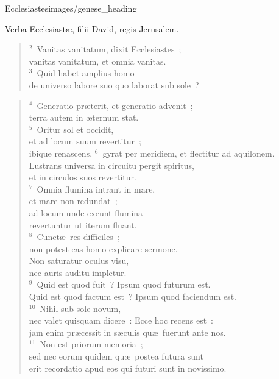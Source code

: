{Ecclesiastes}{images/genese_heading}


\lettrine[lines=6,image=true,loversize=0.05,lraise=-0.03]{V}{}erba Ecclesiast\ae , filii David, regis Jerusalem.
\begin{flushleft}\begin{verse}\vspace{6pt}${}^{2}$~Vanitas vanitatum, dixit Ecclesiastes~;\\ vanitas vanitatum, et omnia vanitas.\\
${}^{3}$~Quid habet amplius homo\\ de universo labore suo quo laborat sub sole~?\end{verse}\end{flushleft}


\begin{flushleft}\begin{verse}${}^{4}$~Generatio pr\ae terit, et generatio advenit~;\\ terra autem in \ae ternum stat.\\
${}^{5}$~Oritur sol et occidit,\\ et ad locum suum revertitur~;\\ ibique renascens,
${}^{6}$~gyrat per meridiem, et flectitur ad aquilonem.\\ Lustrans universa in circuitu pergit spiritus,\\ et in circulos suos revertitur.\\
${}^{7}$~Omnia flumina intrant in mare,\\ et mare non redundat~;\\ ad locum unde exeunt flumina\\ revertuntur ut iterum fluant.\\
${}^{8}$~Cunct\ae\ res difficiles~;\\ non potest eas homo explicare sermone.\\ Non saturatur oculus visu,\\ nec auris auditu impletur.\\
${}^{9}$~Quid est quod fuit~? Ipsum quod futurum est.\\ Quid est quod factum est~? Ipsum quod faciendum est.\\
${}^{10}$~Nihil sub sole novum,\\ nec valet quisquam dicere~: Ecce hoc recens est~:\\ jam enim pr\ae cessit in s\ae culis qu\ae\ fuerunt ante nos.\\
${}^{11}$~Non est priorum memoria~;\\ sed nec eorum quidem qu\ae\ postea futura sunt\\ erit recordatio apud eos qui futuri sunt in novissimo.\end{verse}\end{flushleft}



